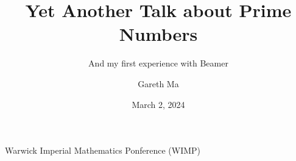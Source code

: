 \documentclass{beamer}
\title{Yet Another Talk about Prime Numbers}
\subtitle{And my first experience with Beamer}
\author{Gareth Ma}
\institute{University of Warwick}
\date{March 2, 2024}
\begin{document}
\begin{frame}
\titlepage
\vskip-0.5cm
\centering Warwick Imperial Mathematics Ponference (WIMP)
\vskip0.5cm
\end{frame}







\end{document}
